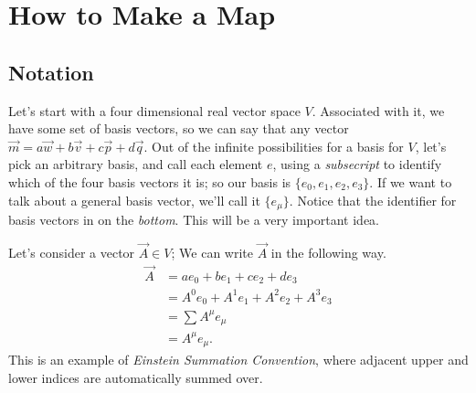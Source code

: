 \chapter{How to Make a Map}\label{chap:maps}
\section{Notation}
Let's start with a four dimensional real vector space $V$.
Associated with it, we have some set of basis vectors, so we can say that any vector $\vec{m} = a\vec{w} + b\vec{v} + c\vec{p} + d\vec{q}$.
Out of the infinite possibilities for a basis for $V$, let's pick an arbitrary basis, and call each element $e$, using a \emph{subsecript} to identify which of the four basis vectors it is; so our basis is $\{e_0, e_1, e_2, e_3\}$.
If we want to talk about a general basis vector, we'll call it $\{e_\mu\}$. Notice that the identifier for basis vectors in on the \emph{bottom}. This will be a very important idea.

Let's consider a vector $\vec{A} \in V$; We can write $\vec{A}$ in the following way.
\begin{align*}
    \vec{A} &= ae_0 + be_1 + ce_2 + de_3 \\
            &= A^0e_0 + A^1e_1 + A^2e_2 + A^3e_3 \\
            &= \sum A^\mu e_\mu \\
            &= A^\mu e_\mu.
\end{align*}
This is an example of \emph{Einstein Summation Convention}, where adjacent upper and lower indices are automatically summed over.

